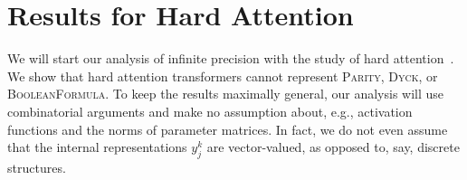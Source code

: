 \documentclass[11pt,a4paper]{article}
\begin{document}
\section{Results for Hard Attention}

We will start our analysis of infinite precision with the study of hard attention~\cite{perez2019turing}.
We show that hard attention transformers cannot represent \textsc{Parity}, \textsc{Dyck}, or \textsc{BooleanFormula}.
To keep the results maximally general, our analysis will use combinatorial arguments and make no assumption about, e.g., activation functions and the norms of parameter matrices.
In fact, we do not even assume that the internal representations $y_j^k$ are vector-valued, as opposed to, say, discrete structures.



\end{document}
